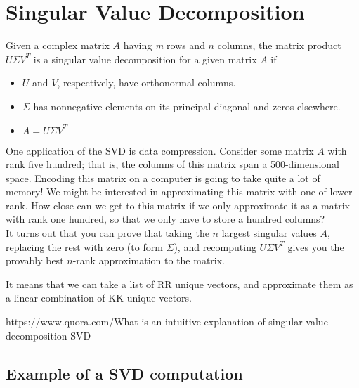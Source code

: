 \chapter{Singular Value Decomposition}

Given a complex matrix $ A $ having \textit{m} rows and $ n $ columns, the matrix product $ U\Sigma V^T $ is a singular value
decomposition for a given matrix $ A $ if
\begin{itemize}
\item $ U $ and $ V $, respectively, have orthonormal columns. 
\item $\Sigma$  has nonnegative elements on its principal diagonal and zeros elsewhere.
\item $ A=U\Sigma V^T $
\end{itemize}
One application of the SVD is data compression. Consider some matrix $ A $ with rank five hundred; that is, the columns of this matrix span a 500-dimensional space. Encoding this matrix on a computer is going to take quite a lot of memory! We might be interested in approximating this matrix with one of lower rank. How close can we get to this matrix if we only approximate it as a matrix with rank one hundred, so that we only have to store a hundred columns?\\
It turns out that you can prove that taking the $ n $ largest singular values $ A $, replacing the rest with zero (to form $ \Sigma $), and recomputing $U\Sigma V^T $ gives you the provably best $ n $-rank approximation to the matrix.


It means that we can take a list of RR unique vectors, and approximate them as a linear combination of KK unique vectors.

https://www.quora.com/What-is-an-intuitive-explanation-of-singular-value-decomposition-SVD
\section{Example of a SVD computation}

